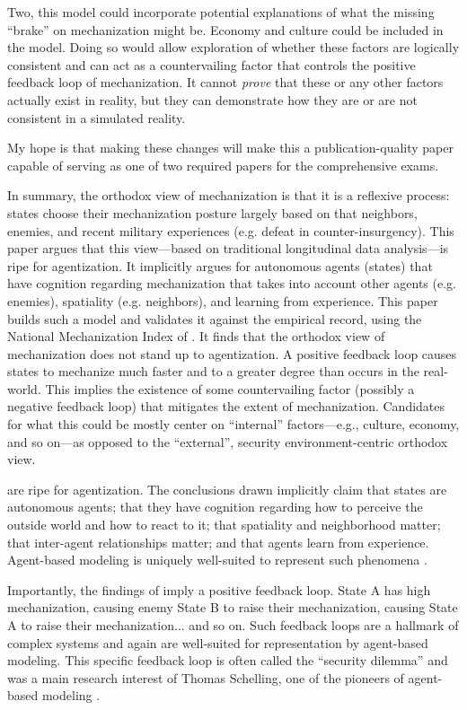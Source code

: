 \documentclass{article}
\begin{document}
Two, this model could incorporate potential explanations of what the missing
``brake'' on mechanization might be. Economy and culture could be included in
the model. Doing so would allow exploration of whether these factors are
logically consistent and can act as a countervailing factor that controls the
positive feedback loop of mechanization. It cannot \textit{prove} that these or
any other factors actually exist in reality, but they can demonstrate how they
are or are not consistent in a simulated reality.

My hope is that making these changes will make this a publication-quality paper
capable of serving as one of two required papers for the comprehensive exams.

\newpage

\printbibliography[heading=bibnumbered]

In summary, the orthodox view of mechanization is that it is a
reflexive process: states choose their mechanization posture largely based on
that neighbors, enemies, and recent military experiences (e.g. defeat in
counter-insurgency). This paper argues
that this view---based on traditional longitudinal data analysis---is ripe for
agentization. It implicitly argues for autonomous agents (states) that have
cognition regarding mechanization that takes into account other agents (e.g.
enemies), spatiality (e.g. neighbors), and learning from experience. This paper
builds such a model and validates it against the empirical record, using the
National Mechanization Index of \citet{sechser2010army}. It finds that the 
orthodox view of mechanization does not stand up to agentization. A positive feedback loop 
causes states to
mechanize much faster and to a greater degree than occurs in the real-world.
This implies the existence of some countervailing factor (possibly a negative
feedback loop) that mitigates the extent of mechanization. Candidates for what
this could be mostly center on ``internal'' factors---e.g., culture, economy,
and so on---as opposed to the ``external'', security environment-centric
orthodox view.

are ripe for agentization. The
conclusions drawn implicitly claim
that states are autonomous agents; that they have
cognition regarding how to perceive the outside world
and how to react to it; that spatiality and
neighborhood matter; that inter-agent relationships matter; and that
agents learn from experience. Agent-based modeling is uniquely well-suited to
represent such phenomena .

Importantly, the findings of \citet{sechser2010army} imply a positive feedback
loop. State A has high
mechanization, causing enemy State B to raise their mechanization, causing State
A to raise their mechanization... and so on. Such feedback loops are a hallmark
of complex systems and again are well-suited for representation by agent-based
modeling. This specific feedback loop is often called
the ``security dilemma'' and was a main research interest of Thomas Schelling, one of the pioneers
of agent-based modeling \citep{schelling1960strategy,schelling2006micromotives}.
\end{document}

